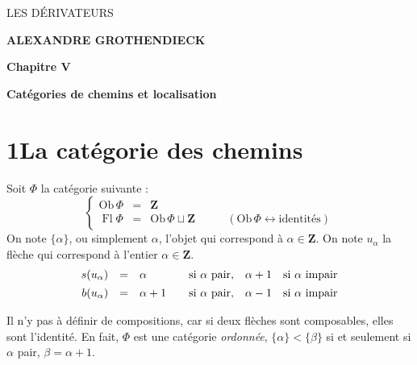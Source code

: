 \documentclass[11pt]{article}
\newcommand{\printedpage}[1]{\marginpar{\footnotesize p.~#1}}
\newcommand{\msp}[1]{\marginpar{\footnotesize [#1]}}
\newcommand{\Ob}{\mathrm{Ob}\,}
\newcommand{\Fl}{\operatorname{Fl}}
\begin{document}
\printedpage{}

\begin{center}
\vspace*{6cm}

{\LARGE\textsf{LES DÉRIVATEURS}}

\vspace{1.5cm}

{\large\textbf{ALEXANDRE GROTHENDIECK}}

\vspace{2.5cm}

{\large\textbf{Chapitre V}}

\vspace{0.4cm}

{\large\textbf{Catégories de chemins et localisation}}
\end{center}

\clearpage

\printedpage{}

\vspace*{6cm}


\clearpage

\printedpage{1}

\msp{page 1}

\section*{1\quad La catégorie des chemins}

Soit $\Phi$ la catégorie suivante :
\[
\left\{
\begin{array}{rcll}
\Ob\Phi & = & \mathbf{Z} & \\
\Fl\Phi & = & \Ob\Phi\sqcup\mathbf{Z} & \qquad (\Ob\Phi\leftrightarrow\text{identités})
\end{array}
\right.
\]
On note $\{\alpha\}$, ou simplement $\alpha$, l'objet qui correspond à $\alpha\in\mathbf{Z}$. On note $u_\alpha$ la flèche qui correspond à l'entier $\alpha\in\mathbf{Z}$.
\[
\begin{array}{rcl@{\qquad}l@{\quad}l@{\quad}l}
s(u_\alpha) & = & \alpha & \text{si } \alpha \text{ pair}, & \alpha+1 & \text{si } \alpha \text{ impair}\\[1ex]
b(u_\alpha) & = & \alpha+1 & \text{si } \alpha \text{ pair}, & \alpha-1 & \text{si } \alpha \text{ impair}
\end{array}
\]

Il n'y pas à définir de compositions, car si deux flèches sont composables, elles sont l'identité. En fait, $\Phi$ est une catégorie \textit{ordonnée}, $\{\alpha\}<\{\beta\}$ si et seulement si $\alpha$ pair, $\beta=\alpha+1$. %
\end{document}

